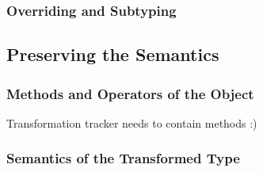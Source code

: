 \subsubsection{Overriding and Subtyping}

\subsection{Preserving the Semantics}
\subsubsection{Methods and Operators of the Object}

Transformation tracker needs to contain methods :)

\subsubsection{Semantics of the Transformed Type}

